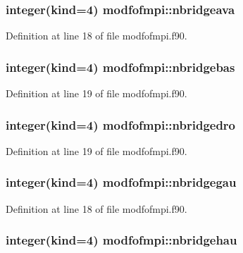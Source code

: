 \hypertarget{classmodfofmpi_a2ce30cec8604582ad8aaa26ef19b41cb}{
\subsubsection[{nbridgeava}]{\setlength{\rightskip}{0pt plus 5cm}integer(kind=4) modfofmpi\-::nbridgeava}}\label{classmodfofmpi_a2ce30cec8604582ad8aaa26ef19b41cb}


Definition at line 18 of file modfofmpi.\-f90.

\hypertarget{classmodfofmpi_ad71e96722537b8de69afdb8f68028e8b}{
\subsubsection[{nbridgebas}]{\setlength{\rightskip}{0pt plus 5cm}integer(kind=4) modfofmpi\-::nbridgebas}}\label{classmodfofmpi_ad71e96722537b8de69afdb8f68028e8b}


Definition at line 19 of file modfofmpi.\-f90.

\hypertarget{classmodfofmpi_a0253e42a34623e4816f27522252d1e29}{
\subsubsection[{nbridgedro}]{\setlength{\rightskip}{0pt plus 5cm}integer(kind=4) modfofmpi\-::nbridgedro}}\label{classmodfofmpi_a0253e42a34623e4816f27522252d1e29}


Definition at line 19 of file modfofmpi.\-f90.

\hypertarget{classmodfofmpi_a000b4f4f0140c24648780b86d56698cf}{
\subsubsection[{nbridgegau}]{\setlength{\rightskip}{0pt plus 5cm}integer(kind=4) modfofmpi\-::nbridgegau}}\label{classmodfofmpi_a000b4f4f0140c24648780b86d56698cf}


Definition at line 18 of file modfofmpi.\-f90.

\hypertarget{classmodfofmpi_a81ecc186519e9addf2dbf7ec92e32d23}{
\subsubsection[{nbridgehau}]{\setlength{\rightskip}{0pt plus 5cm}integer(kind=4) modfofmpi\-::nbridgehau}}\label{classmodfofmpi_a81ecc186519e9addf2dbf7ec92e32d23}


